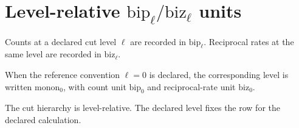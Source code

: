 \section{Level-relative \texorpdfstring{$\mathrm{bip}_{\ell}/\mathrm{biz}_{\ell}$}{bip/biz} units}
\label{app:level-relative-bip-biz}

Counts at a declared cut level \(\ell\) are recorded in \(\mathrm{bip}_{\ell}\). Reciprocal rates at the same level are recorded in \(\mathrm{biz}_{\ell}\).

When the reference convention \(\ell=0\) is declared, the corresponding level is written \(\mathrm{monon}_0\), with count unit \(\mathrm{bip}_0\) and reciprocal-rate unit \(\mathrm{biz}_0\).

The cut hierarchy is level-relative. The declared level fixes the row for the declared calculation.
